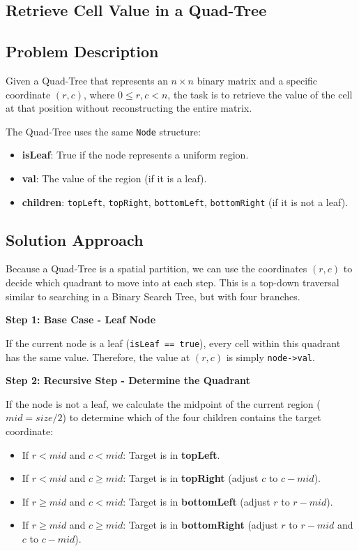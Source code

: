 \subsection {Retrieve Cell Value in a Quad-Tree}

\subsection*{Problem Description}

Given a Quad-Tree that represents an $n \times n$ binary matrix and a specific coordinate $(r, c)$, where $0 \le r, c < n$, the task is to retrieve the value of the cell at that position without reconstructing the entire matrix.

The Quad-Tree uses the same \texttt{Node} structure:
\begin{itemize}
\item \textbf{isLeaf}: True if the node represents a uniform region.
\item \textbf{val}: The value of the region (if it is a leaf).
\item \textbf{children}: \texttt{topLeft}, \texttt{topRight}, \texttt{bottomLeft}, \texttt{bottomRight} (if it is not a leaf).
\end{itemize}

\subsection*{Solution Approach}

Because a Quad-Tree is a spatial partition, we can use the coordinates $(r, c)$ to decide which quadrant to move into at each step. This is a top-down traversal similar to searching in a Binary Search Tree, but with four branches.

\textbf{Step 1: Base Case - Leaf Node}

If the current node is a leaf (\texttt{isLeaf == true}), every cell within this quadrant has the same value. Therefore, the value at $(r, c)$ is simply \texttt{node->val}.

\textbf{Step 2: Recursive Step - Determine the Quadrant}

If the node is not a leaf, we calculate the midpoint of the current region ($mid = size / 2$) to determine which of the four children contains the target coordinate:
\begin{itemize}
    \item If $r < mid$ and $c < mid$: Target is in \textbf{topLeft}.
    \item If $r < mid$ and $c \ge mid$: Target is in \textbf{topRight} (adjust $c$ to $c - mid$).
    \item If $r \ge mid$ and $c < mid$: Target is in \textbf{bottomLeft} (adjust $r$ to $r - mid$).
    \item If $r \ge mid$ and $c \ge mid$: Target is in \textbf{bottomRight} (adjust $r$ to $r - mid$ and $c$ to $c - mid$).
\end{itemize}


